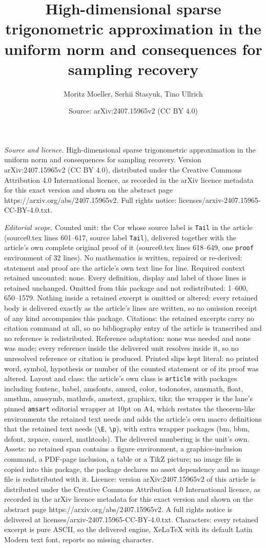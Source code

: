 \documentclass[10pt,a4paper]{amsart}
\title[High-dimensional sparse trigonometric approximation in the u]{High-dimensional sparse trigonometric approximation in the uniform norm and consequences for sampling recovery}
\author{Moritz Moeller, Serhii Stasyuk, Tino Ullrich}
\date{Source: arXiv:2407.15965v2 (CC BY 4.0)}
\begin{document}
\maketitle

\noindent\emph{Source and licence.} High-dimensional sparse trigonometric approximation in the uniform norm and consequences for sampling recovery. Version arXiv:2407.15965v2 (CC BY 4.0), distributed under the Creative Commons Attribution 4.0 International licence, as recorded in the arXiv licence metadata for this exact version and shown on the abstract page https://arxiv.org/abs/2407.15965v2. Full rights notice: licenses/arxiv-2407.15965-CC-BY-4.0.txt.\par\smallskip

\noindent\textit{Editorial scope.} Counted unit: the Cor whose source label is \texttt{Tail} in the article (source0.tex lines 601--617, source label \texttt{Tail}), delivered together with the article's own complete original proof of it (source0.tex lines 618--649, one \texttt{proof} environment of 32 lines). No mathematics is written, repaired or re-derived: statement and proof are the article's own text line for line. Required context retained uncounted: none. Every definition, display and label of those lines is retained unchanged. Omitted from this package and not redistributed: 1--600, 650--1579. Nothing inside a retained excerpt is omitted or altered: every retained body is delivered exactly as the article's lines are written, so no omission receipt of any kind accompanies this package. Citations: the retained excerpts carry no citation command at all, so no bibliography entry of the article is transcribed and no reference is redistributed. Reference adaptation: none was needed and none was made; every reference inside the delivered unit resolves inside it, so no unresolved reference or citation is produced. Printed slips kept literal: no printed word, symbol, hypothesis or number of the counted statement or of its proof was altered. Layout and class: the article's own class is \texttt{article} with packages including fontenc, babel, amsfonts, amscd, color, todonotes, amsmath, float, amsthm, amssymb, mathrsfs, amstext, graphicx, tikz; the wrapper is the lane's pinned \texttt{amsart} editorial wrapper at 10pt on A4, which restates the theorem-like environments the retained text needs and adds the article's own macro definitions that the retained text needs (\texttt{\textbackslash E}, \texttt{\textbackslash p}), with extra wrapper packages (bm, bbm, dsfont, xspace, cancel, mathtools). The delivered numbering is the unit's own. Assets: no retained span contains a figure environment, a graphics-inclusion command, a PDF-page inclusion, a table or a TikZ picture; no image file is copied into this package, the package declares no asset dependency and no image file is redistributed with it. Licence: version arXiv:2407.15965v2 of this article is distributed under the Creative Commons Attribution 4.0 International licence, as recorded in the arXiv licence metadata for this exact version and shown on the abstract page https://arxiv.org/abs/2407.15965v2. A full rights notice is delivered at licenses/arxiv-2407.15965-CC-BY-4.0.txt. Characters: every retained excerpt is pure ASCII, so the delivered engine, XeLaTeX with its default Latin Modern text font, reports no missing character.
\end{document}
